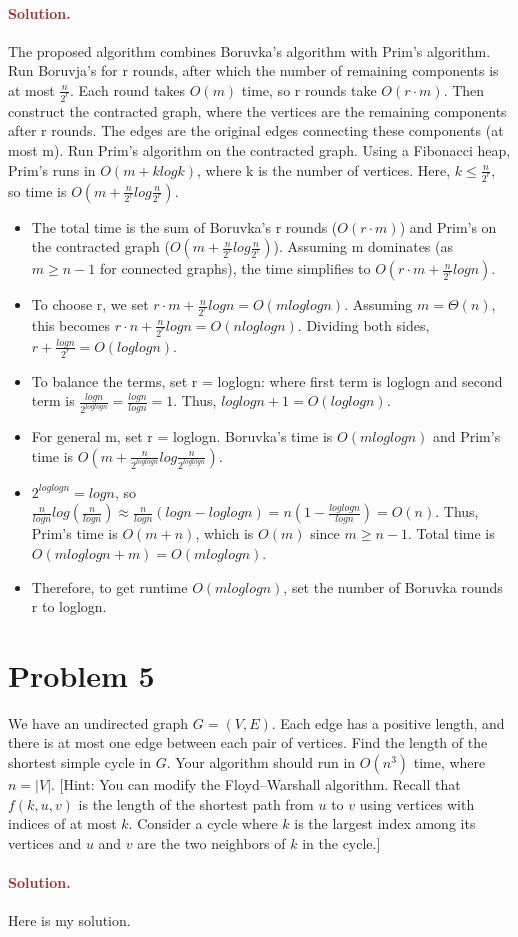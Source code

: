 \paragraph{\textcolor{brown}{Solution.}}
The proposed algorithm combines Boruvka's algorithm with Prim's algorithm. Run Boruvja's for r rounds, after which the number of remaining components is at most $\frac{n}{2^r}$. Each round takes $O(m)$ time, so r rounds take $O(r\cdot m)$. Then construct the contracted graph, where the vertices are the remaining components after r rounds. The edges are the original edges connecting these components (at most m). Run Prim's algorithm on the contracted graph. Using a Fibonacci heap, Prim's runs in  $O(m+klogk)$, where k is the number of vertices. Here, $k \leq \frac{n}{2^r}$, so time is $O(m+\frac{n}{2^r}log\frac{n}{2^r})$. \begin{itemize} \item The total time is the sum of Boruvka's r rounds ($O(r\cdot m)$) and Prim's on the contracted graph ($O(m+\frac{n}{2^r}log\frac{n}{2^r})$). Assuming m dominates (as $m\geq n - 1$ for connected graphs), the time simplifies to $O(r\cdot m + \frac{n}{2^r}log{n})$. \item To choose r, we set $r \cdot m + \frac{n}{2^r}log{n} = O(mloglogn)$. Assuming $m = \Theta(n)$, this becomes $r \cdot n + \frac{n}{2^r}log n = O(nloglogn)$. Dividing both sides, $r + \frac{logn}{2^r} = O(loglogn)$. \item To balance the terms, set r = loglogn: where first term is loglogn and second term is $\frac{logn}{2^{loglogn}} = \frac{logn}{logn} = 1$. Thus, $loglogn + 1 = O(loglogn)$. \item For general m, set r = loglogn. Boruvka's time is $O(mloglogn)$ and Prim's time is $O(m + \frac{n}{2^{loglogn}}log\frac{n}{2^{loglogn}})$. \item $2^{loglogn} = logn$, so $\frac{n}{logn}log(\frac{n}{logn}) \approx \frac{n}{logn}(logn - loglogn) = n(1 - \frac{loglogn}{logn}) = O(n)$. Thus, Prim's time is $O(m + n)$, which is $O(m)$ since $m\geq n - 1$. Total time is $O(mloglogn + m) = O(mloglogn)$. \item Therefore, to get runtime $O(mloglogn)$, set the number of Boruvka rounds r to loglogn. \end{itemize}


\section*{Problem 5}
We have an undirected graph $G = (V, E)$. Each edge has a positive length, and there is at most one edge between each pair of vertices. Find the length of the shortest simple cycle in $G$. Your algorithm should run in $O(n^3)$ time, where $n = |V|$. [Hint: You can modify the Floyd--Warshall algorithm. Recall that $f(k, u, v)$ is the length of the shortest path from $u$ to $v$ using vertices with indices of at most $k$. Consider a cycle where $k$ is the largest index among its vertices and $u$ and $v$ are the two neighbors of $k$ in the cycle.]

\paragraph{\textcolor{brown}{Solution.}}
Here is my solution.

